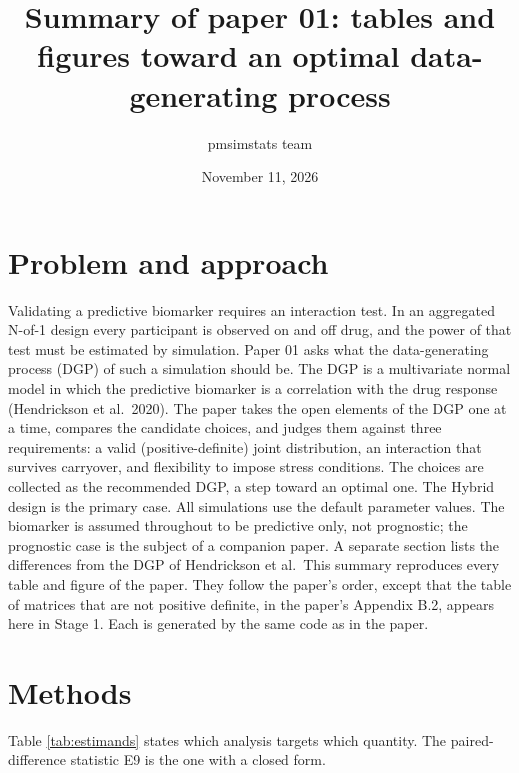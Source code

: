 \documentclass[
  11pt,
]{article}
\title{Summary of paper 01: tables and figures toward an optimal data-generating process}
\author{pmsimstats team}
\date{November 11, 2026}
\begin{document}
\maketitle

\nolinenumbers

\section*{Problem and approach}\label{problem-and-approach}

Validating a predictive biomarker requires an interaction test. In an
aggregated N-of-1 design every participant is observed on and off
drug, and the power of that test must be estimated by simulation.
Paper 01 asks what the data-generating process (DGP) of such a
simulation should be. The DGP is a multivariate normal model in which
the predictive biomarker is a correlation with the drug response
(Hendrickson et al.~2020). The paper takes the open elements of the
DGP one at a time, compares the candidate choices, and judges them
against three requirements: a valid (positive-definite) joint
distribution, an interaction that survives carryover, and flexibility
to impose stress conditions. The
choices are collected as the recommended DGP, a step toward an optimal
one. The Hybrid design is the primary case. All simulations use the
default parameter values. The biomarker is assumed throughout to be
predictive only, not prognostic; the prognostic case is the subject of
a companion paper. A separate section lists the differences from the
DGP of Hendrickson et al.~This summary reproduces every table and
figure of the paper. They follow the paper's order, except that the
table of matrices that are not positive definite, in the paper's
Appendix B.2, appears here in Stage 1. Each is generated by the same
code as in the paper.

\section{Methods}\label{methods}

Table \ref{tab:estimands} states which analysis targets which
quantity. The paired-difference statistic E9 is the one with a closed
form.
\end{document}
